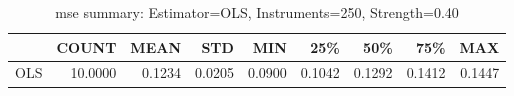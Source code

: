 \begin{table}[ht]
\centering
\caption{mse summary: Estimator=OLS, Instruments=250, Strength=0.40}
\begin{tabular}{lrrrrrrrr}
\toprule
 & COUNT & MEAN & STD & MIN & 25\% & 50\% & 75\% & MAX \\
\midrule
OLS & 10.0000 & 0.1234 & 0.0205 & 0.0900 & 0.1042 & 0.1292 & 0.1412 & 0.1447 \\
\bottomrule
\end{tabular}
\end{table}
